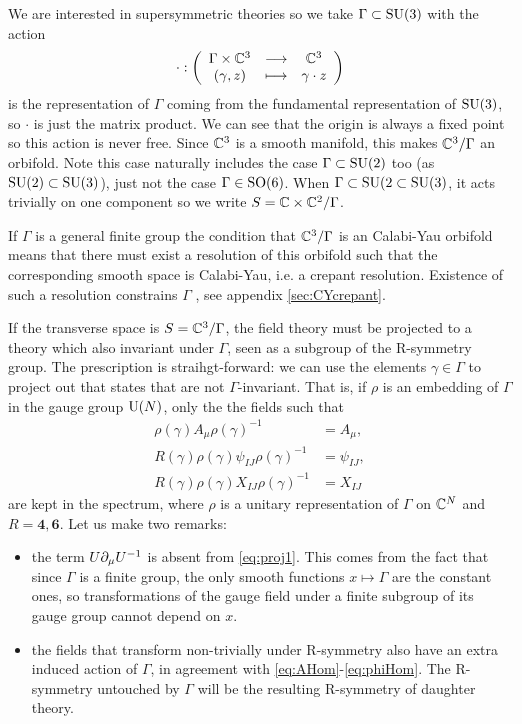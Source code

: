         We are interested in supersymmetric theories so we take $\Gamma\subset\text{SU}(3)$ with the action
        \begin{equation}
            \cdot:\left(
            \begin{array}{ccc}
                \Gamma\times\mathbb{C}^3 & \longrightarrow & \mathbb{C}^3 \\
                (\gamma,z) & \longmapsto & \gamma\cdot z
            \end{array}
            \right)
        \end{equation}
        is the representation of $\Gamma$ coming from the fundamental representation of $\text{SU}(3)$, so $\cdot$ is just the matrix product. We can see that the origin is always a fixed point so this action is never free. Since $\mathbb{C}^3$ is a smooth manifold, this makes $\mathbb{C}^3/\Gamma$ an orbifold. Note this case naturally includes the case $\Gamma\subset\text{SU}(2)$ too (as $\text{SU}(2)\subset\text{SU}(3)$), just not the case $\Gamma\in\text{SO}(6)$. When $\Gamma\subset\text{SU}(2\subset\text{SU}(3)$, it acts trivially on one component so we write $S=\mathbb{C}\times\mathbb{C}^2/\Gamma$.

        If $\Gamma$ is a general finite group the condition that $\mathbb{C}^3/\Gamma$ is an Calabi-Yau orbifold means that there must exist a resolution of this orbifold such that the corresponding smooth space is Calabi-Yau, i.e. a crepant resolution. Existence of such a resolution constrains $\Gamma$ \marker, see appendix \ref{sec:CYcrepant}.

        If the transverse space is $S=\mathbb{C}^3/\Gamma$, the field theory must be projected to a theory which also invariant under $\Gamma$, seen as a subgroup of the R-symmetry group. The prescription is straihgt-forward: we can use the elements $\gamma\in\Gamma$ to project out that states that are not $\Gamma$-invariant. That is, if $\rho$ is an embedding of $\Gamma$ in the gauge group $\text{U}(N)$, only the the fields such that
        \begin{align}
            \rho(\gamma) A_\mu \rho(\gamma)^{-1} &= A_\mu,\label{eq:proj1}\\
            R(\gamma)\rho(\gamma) \psi_{IJ} \rho(\gamma)^{-1} &= \psi_{IJ}\label{eq:proj2},\\
            R(\gamma)\rho(\gamma) X_{IJ} \rho(\gamma)^{-1} &= X_{IJ}\label{eq:proj3}
        \end{align}
        are kept in the spectrum, where $\rho$ is a unitary representation of $\Gamma$ on $\mathbb{C}^N$ and $R=\boldsymbol{4},\boldsymbol{6}$.
        Let us make two remarks:
        \begin{itemize}
            \item the term $U\partial_\mu U^{-1}$ is absent from \ref{eq:proj1}. This comes from the fact that since $\Gamma$ is a finite group, the only smooth functions $x\mapsto\Gamma$ are the constant ones, so transformations of the gauge field under a finite subgroup of its gauge group cannot depend on $x$.
            \item the fields that transform non-trivially under R-symmetry also have an extra induced action of $\Gamma$, in agreement with \eqref{eq:AHom}-\eqref{eq:phiHom}. The R-symmetry untouched by $\Gamma$ will be the resulting R-symmetry of daughter theory.
        \end{itemize}

